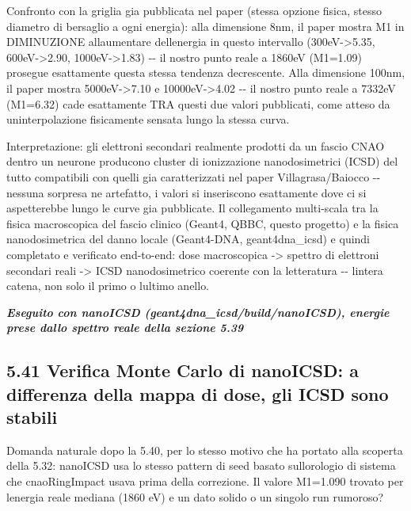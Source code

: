 \documentclass[
  italian,
]{article}
\begin{document}
Confronto con la griglia gia\textquotesingle{} pubblicata nel paper (stessa opzione fisica, stesso diametro di bersaglio a ogni energia): alla dimensione 8nm, il paper mostra M1 in DIMINUZIONE all\textquotesingle aumentare dell\textquotesingle energia in questo intervallo (300eV-\textgreater5.35, 600eV-\textgreater2.90, 1000eV-\textgreater1.83) -\/- il nostro punto reale a 1860eV (M1=1.09) prosegue esattamente questa stessa tendenza decrescente. Alla dimensione 100nm, il paper mostra 5000eV-\textgreater7.10 e 10000eV-\textgreater4.02 -\/- il nostro punto reale a 7332eV (M1=6.32) cade esattamente TRA questi due valori pubblicati, come atteso da un\textquotesingle interpolazione fisicamente sensata lungo la stessa curva.

Interpretazione: gli elettroni secondari realmente prodotti da un fascio CNAO dentro un neurone producono cluster di ionizzazione nanodosimetrici (ICSD) del tutto compatibili con quelli gia\textquotesingle{} caratterizzati nel paper Villagrasa/Baiocco -\/- nessuna sorpresa ne\textquotesingle{} artefatto, i valori si inseriscono esattamente dove ci si aspetterebbe lungo le curve gia\textquotesingle{} pubblicate. Il collegamento multi-scala tra la fisica macroscopica del fascio clinico (Geant4, QBBC, questo progetto) e la fisica nanodosimetrica del danno locale (Geant4-DNA, geant4dna\_\allowbreak{}icsd) e\textquotesingle{} quindi completato e verificato end-to-end: dose macroscopica -\textgreater{} spettro di elettroni secondari reali -\textgreater{} ICSD nanodosimetrico coerente con la letteratura -\/- l\textquotesingle intera catena, non solo il primo o l\textquotesingle ultimo anello.

\emph{\textbf{Eseguito con nanoICSD (geant4dna\_\allowbreak{}icsd/build/nanoICSD), energie prese dallo spettro reale della sezione 5.39}}

\subsection{5.41 Verifica Monte Carlo di nanoICSD: a differenza della mappa di dose, gli ICSD sono stabili}\label{verifica-monte-carlo-di-nanoicsd-a-differenza-della-mappa-di-dose-gli-icsd-sono-stabili}

Domanda naturale dopo la 5.40, per lo stesso motivo che ha portato alla scoperta della 5.32: nanoICSD usa lo stesso pattern di seed basato sull\textquotesingle orologio di sistema che cnaoRingImpact usava prima della correzione. Il valore M1=1.090 trovato per l\textquotesingle energia reale mediana (1860 eV) e\textquotesingle{} un dato solido o un singolo run rumoroso?
\end{document}
